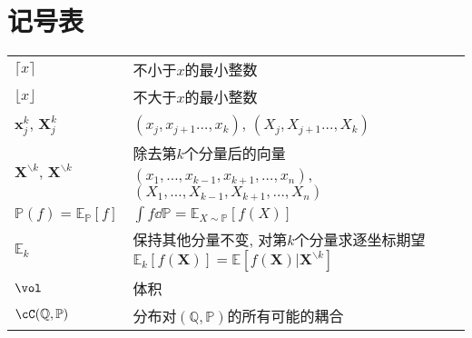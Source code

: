 \section*{记号表}

\noindent
\begin{tabular}{p{} p{}}
\hline
	$\lceil x \rceil$ & 不小于$x$的最小整数 \\
	$\lfloor x \rfloor$ & 不大于$x$的最小整数 \\
	$\bm{x}_j^k$, $\bm{X}_j^k$ & $(x_j, x_{j+1} \dots, x_k)$, $(X_j, X_{j+1} \dots, X_k)$ \\
	$\bm{X}^{\backslash k}$, $\bm{X}^{\backslash k}$ & 除去第$k$个分量后的向量$(x_1, \dots, x_{k-1}, x_{k+1}, \dots, x_n)$, $(X_1, \dots, X_{k-1}, X_{k+1}, \dots, X_n)$ \\
	$\mathbb{P}(f) = \mathbb{E}_{\mathbb{P}}[f]$ & $\int f \dd \mathbb{P} = \mathbb{E}_{X \sim \mathbb{P}} [f(X)]$ \\
	$\mathbb{E}_k$ & 保持其他分量不变, 对第$k$个分量求逐坐标期望$\mathbb{E}_k[f(\bm{X})] = \mathbb{E}[f(\bm{X}) | \bm{X}^{\backslash k}]$ \\
	$\vol$ & 体积 \\
	$\cC(\mathbb{Q}, \mathbb{P})$ & 分布对$(\mathbb{Q}, \mathbb{P})$的所有可能的耦合 \\
\hline
\end{tabular}
